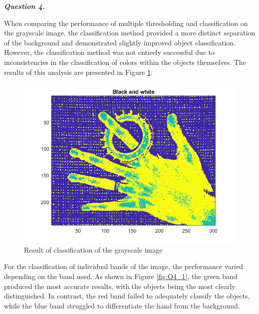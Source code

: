 \documentclass[12pt]{article}
\begin{document}
\textbf{\emph{Question 4.}}

When comparing the performance of multiple thresholding and classification on the grayscale image, the classification method provided a more distinct separation of the background and demonstrated slightly improved object classification. However, the classification method was not entirely successful due to inconsistencies in the classification of colors within the objects themselves. The results of this analysis are presented in Figure \ref{fig:Q4_bw}.
\begin{figure}[htbp!]
  \centering
  \includegraphics[width = 15cm]{images/Q4_bw.png}
  \caption{Result of classification of the grayscale image}
  \label{fig:Q4_bw}
\end{figure}
For the classification of individual bands of the image, the performance varied depending on the band used. As shown in Figure \ref{fig:Q4_1}, the green band produced the most accurate results, with the objects being the most clearly distinguished. In contrast, the red band failed to adequately classify the objects, while the blue band struggled to differentiate the hand from the background.
\end{document}
